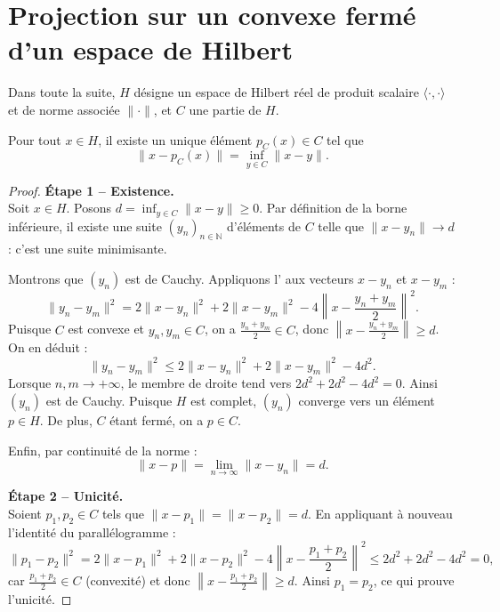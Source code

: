 \documentclass[11pt,a4paper]{article}
\begin{document}
\section{Projection sur un convexe fermé d'un espace de Hilbert}

Dans toute la suite, $H$ désigne un espace de Hilbert réel de produit scalaire
$\langle \cdot, \cdot \rangle$ et de norme associée $\|\cdot\|$, et $C$ une
partie  de $H$.

\begin{theorem}
Pour tout $x \in H$, il existe un unique élément $p_C(x) \in C$ tel que
\[
\|x - p_C(x)\| = \inf_{y \in C} \|x - y\|.
\]
\end{theorem}

\begin{proof}
\noindent
\textbf{Étape 1 -- Existence.}\\
Soit $x \in H$. Posons $d = \inf_{y \in C} \|x - y\| \geq 0$.
Par définition de la borne inférieure, il existe une suite $(y_n)_{n \in \mathbb{N}}$
d'éléments de $C$ telle que $\|x - y_n\| \to d$ : c'est une suite minimisante.

Montrons que $(y_n)$ est de Cauchy. Appliquons l'
aux vecteurs $x - y_n$ et $x - y_m$ :
\[
\|y_n - y_m\|^2 = 2\|x - y_n\|^2 + 2\|x - y_m\|^2 - 4\left\|x - \frac{y_n + y_m}{2}\right\|^2.
\]
Puisque $C$ est convexe et $y_n, y_m \in C$, on a $\frac{y_n + y_m}{2} \in C$,
donc $\left\|x - \frac{y_n + y_m}{2}\right\| \geq d$. On en déduit :
\[
\|y_n - y_m\|^2 \leq 2\|x - y_n\|^2 + 2\|x - y_m\|^2 - 4d^2.
\]
Lorsque $n, m \to +\infty$, le membre de droite tend vers $2d^2 + 2d^2 - 4d^2 = 0$.
Ainsi $(y_n)$ est de Cauchy. Puisque $H$ est complet, $(y_n)$ converge vers
un élément $p \in H$. De plus, $C$ étant fermé, on a $p \in C$.

Enfin, par continuité de la norme :
\[
\|x - p\| = \lim_{n \to \infty} \|x - y_n\| = d.
\]

\textbf{Étape 2 -- Unicité.}\\
Soient $p_1, p_2 \in C$ tels que $\|x - p_1\| = \|x - p_2\| = d$.
En appliquant à nouveau l'identité du parallélogramme :
\[
\|p_1 - p_2\|^2 = 2\|x - p_1\|^2 + 2\|x - p_2\|^2 - 4\left\|x - \frac{p_1 + p_2}{2}\right\|^2
\leq 2d^2 + 2d^2 - 4d^2 = 0,
\]
car $\frac{p_1 + p_2}{2} \in C$ (convexité) et donc
$\left\|x - \frac{p_1 + p_2}{2}\right\| \geq d$.
Ainsi $p_1 = p_2$, ce qui prouve l'unicité.
\end{proof}
\end{document}
